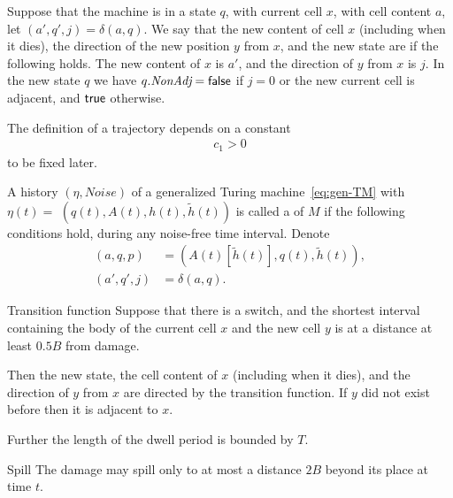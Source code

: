 \documentclass[12pt]{memoir}
\newcommand{\fld}[1]{\ensuremath{\textit{#1}}}
\renewcommand{\B}{B}
\newcommand{\h}{h}
\newcommand{\hc}{\tilde h}
\newcommand{\Noise}{\mathit{Noise}}
\newcommand{\Tu}{T}
\renewcommand{\G}{\fld{NonAdj}} %
\begin{document}
\begin{definition}
Suppose that the machine is in a state $q$, with current cell $x$, 
with cell content $a$, let $(a',q',j) = \delta(a,q)$.
We say that the new content of cell \( x \) (including when it dies),
the direction of the new position \( y \) from \( x \),
and the new state are  if
the following holds.
The new content of \( x \) is \( a' \), and
the direction of \( y \) from \( x \) is \( j \).
In the new state \( q \) we have \( q.\G=\false \)
if \( j=0 \) or the new current cell is adjacent, and \( \hbox{\sffamily true} \) otherwise.  
\end{definition}

\begin{definition}[Trajectory]\label{def:traj}
The definition of a trajectory depends on a constant 
\begin{align*}
   c_{1}>0
 \end{align*}
to be fixed later.

\begin{sloppypar}
   A history  $(\eta, \Noise)$ of a generalized Turing 
machine~\eqref{eq:gen-TM} with \(\eta(t) =\)
\( (q(t), A(t), \h(t), \hc(t)) \)
is called a  of $M$ if the following conditions hold, during any 
noise-free time interval.
Denote 
\begin{align*}
     (a, q, p) &= (A(t)[\hc(t)], q(t),\hc(t)),
\\ (a',q',j)   &= \delta(a,q).
 \end{align*}
  \end{sloppypar}
\begin{flushdescription}

\item[Transition function]\label{i:def.traj.transition}
Suppose that there is a switch, and the shortest interval
containing the body of the current cell \( x \) and the
new cell \( y \) is at a distance at least \( 0.5\B \)
from damage.

Then the new state, the cell content of \( x \) (including when it dies), and
the direction of \( y \) from \( x \) are directed by the transition function.
If \( y \) did not exist before then it is adjacent to \( x \).

Further the length of the dwell period is bounded by \( \Tu \).

\item[Spill]\label{i:bound-on-damage}
  The damage may spill only to at most a distance \( 2\B \) beyond its 
place at time \( t \).


\end{flushdescription}
\end{definition}
\end{document}
